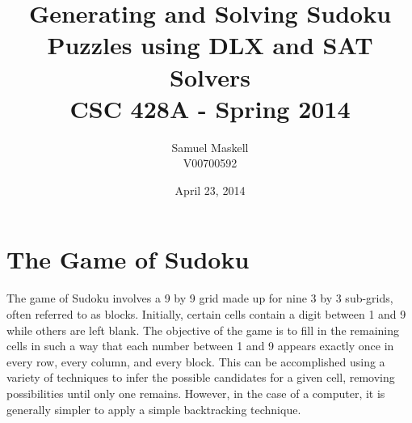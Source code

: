 \documentclass[12pt]{article}
\title{Generating and Solving Sudoku Puzzles using DLX and SAT Solvers\\CSC 428A - Spring 2014}
\date{April 23, 2014}
\author{Samuel Maskell\\ V00700592}
\newcounter{row}
\newcounter{col}
\begin{document}
\begin{titlepage}
\maketitle
\thispagestyle{empty}
\end{titlepage}
\pagestyle{fancy}
\section{The Game of Sudoku}
The game of Sudoku involves a 9 by 9 grid made up for nine 3 by 3 sub-grids, often referred to as blocks. Initially, certain cells contain a digit between 1 and 9 while others are left blank. The objective of the game is to fill in the remaining cells in such a way that each number between 1 and 9 appears exactly once in every row, every column, and every block. This can be accomplished using a variety of techniques to infer the possible candidates for a given cell, removing possibilities until only one remains. However, in the case of a computer, it is generally simpler to apply a simple backtracking technique. \\
\end{document}
